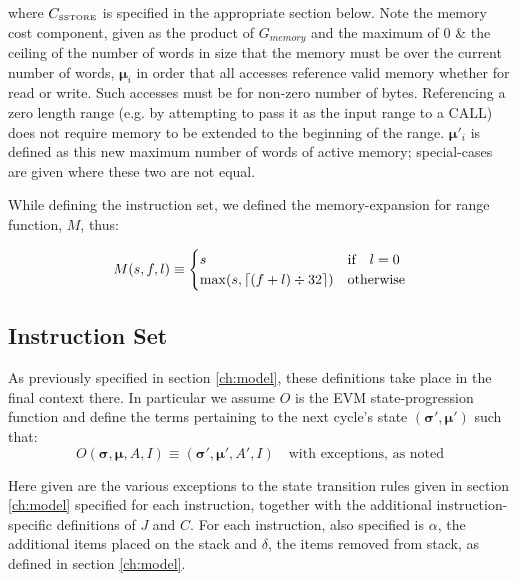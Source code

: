 \documentclass[9pt,oneside]{amsart}
\DeclarePairedDelimiter{\ceil}{\lceil}{\rceil}
\begin{document}
where $C_\text{\tiny SSTORE}$ is specified in the appropriate section below. Note the memory cost component, given as the product of $G_{memory}$ and the maximum of 0 \& the ceiling of the number of words in size that the memory must be over the current number of words, $\boldsymbol{\mu}_i$ in order that all accesses reference valid memory whether for read or write. Such accesses must be for non-zero number of bytes. Referencing a zero length range (e.g. by attempting to pass it as the input range to a CALL) does not require memory to be extended to the beginning of the range. $\boldsymbol{\mu}'_i$ is defined as this new maximum number of words of active memory; special-cases are given where these two are not equal.

While defining the instruction set, we defined the memory-expansion for range function, $M$, thus:

\begin{equation}
M(s, f, l) \equiv \begin{cases}
s & \text{if} \quad l = 0 \\
\max(s, \ceil{ (f + l) \div 32 }) & \text{otherwise}
\end{cases}
\end{equation}

\subsection{Instruction Set}

As previously specified in section \ref{ch:model}, these definitions take place in the final context there. In particular we assume $O$ is the EVM state-progression function and define the terms pertaining to the next cycle's state $(\boldsymbol{\sigma}', \boldsymbol{\mu}')$ such that:
\begin{equation}
O(\boldsymbol{\sigma}, \boldsymbol{\mu}, A, I) \equiv (\boldsymbol{\sigma}', \boldsymbol{\mu}', A', I) \quad \text{with exceptions, as noted}
\end{equation}

Here given are the various exceptions to the state transition rules given in section \ref{ch:model} specified for each instruction, together with the additional instruction-specific definitions of $J$ and $C$. For each instruction, also specified is $\alpha$, the additional items placed on the stack and $\delta$, the items removed from stack, as defined in section \ref{ch:model}.
\end{document}
